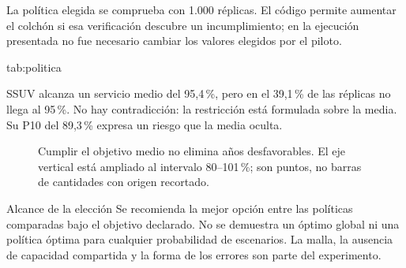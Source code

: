 La política elegida se comprueba con 1.000 réplicas. El código permite aumentar
el colchón si esa verificación descubre un incumplimiento; en la ejecución
presentada no fue necesario cambiar los valores elegidos por el piloto.

{tab:politica}{}

SSUV alcanza un servicio medio del 95,4\,\%, pero en el 39,1\,\% de las
réplicas no llega al 95\,\%. No hay contradicción: la restricción está formulada
sobre la media. Su P10 del 89,3\,\% expresa un riesgo que la media oculta.

\begin{figure}[htbp]\centering
{}
\caption{Cumplir el objetivo medio no elimina años desfavorables.
El eje vertical está ampliado al intervalo 80--101\,\%; son puntos, no barras
de cantidades con origen recortado.}
\label{fig:servicio}
\end{figure}

\begin{idea}{Alcance de la elección}
Se recomienda la mejor opción entre las políticas comparadas bajo el objetivo
declarado. No se demuestra un óptimo global ni una política óptima para cualquier
probabilidad de escenarios. La malla, la ausencia de capacidad compartida y la
forma de los errores son parte del experimento.
\end{idea}
\FloatBarrier
